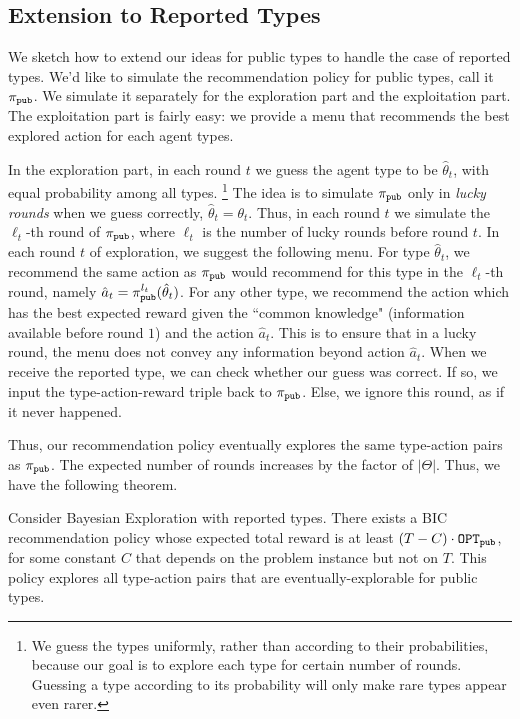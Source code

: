 
\subsection{Extension to Reported Types}
\label{sec:reported}

\newcommand{\pipub}{\pi_{\term{pub}}}

We sketch how to extend our ideas for public types to handle the case of reported types. We'd like to simulate the recommendation policy for public types, call it $\pipub$. We simulate it separately for the exploration part and the exploitation part. The exploitation part is fairly easy: we provide a menu that recommends the best explored action for each agent types.

In the exploration part, in each round $t$ we guess the agent type to be $\hat{\theta}_t$, with equal probability among all types.%
\footnote{We guess the types uniformly, rather than according to their probabilities, because our goal is to explore each type for certain number of rounds. Guessing a type according to its probability will only make rare types appear even rarer.}
The idea is to simulate $\pipub$ only in \emph{lucky rounds} when we guess correctly, \ie $\hat{\theta}_t=\theta_t$. Thus,
in each round $t$ we simulate the $\ell_t$-th round of $\pipub$, where $\ell_t$ is the number of lucky rounds before round $t$. In each round $t$ of exploration, we suggest the following menu. For type $\hat{\theta}_t$, we recommend the same action as $\pipub$ would recommend for this type in the $\ell_t$-th round, namely
    $\hat{a}_t = \pipub^{\ell_t}(\hat{\theta}_t)$.
For any other type, we recommend the action which has the best expected reward given the ``common knowledge" (information available before round $1$) and the action $\hat{a}_t$. This is to ensure that in a lucky round, the menu does not convey any information beyond action  $\hat{a}_t$. When we receive the reported type, we can check whether our guess was correct. If so, we input the type-action-reward triple back to $\pipub$. Else, we ignore this round, as if it never happened.

Thus, our recommendation policy eventually explores the same type-action pairs as $\pipub$. The expected number of rounds increases by the factor of $|\varTheta|$. Thus, we have the following theorem.

\begin{theorem}
\label{thm:reported}
Consider Bayesian Exploration with reported types.
There exists a BIC recommendation policy whose expected total reward is at least $\left(T - C \right) \cdot \mathtt{OPT}_{\mathtt{pub}}$,
for some constant $C$ that depends on the problem instance but not on $T$.
This policy explores all type-action pairs that are eventually-explorable
for public types.
\end{theorem}

